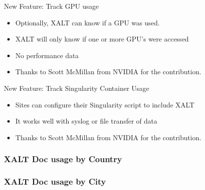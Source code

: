 \documentclass{beamer}
\begin{document}
\begin{frame}{New Feature: Track GPU usage}
  \begin{itemize}
    \item Optionally, XALT can know if a GPU was used.
    \item XALT will only know if one or more GPU's were accessed
    \item No performance data
    \item Thanks to Scott McMillan from NVIDIA for the contribution.
  \end{itemize}
\end{frame}

\begin{frame}{New Feature: Track Singularity Container Usage}
  \begin{itemize}
    \item Sites can configure their Singularity script to include XALT
    \item It works well with syslog or file transfer of data
    \item Thanks to Scott McMillan from NVIDIA for the contribution.
  \end{itemize}
\end{frame}

\begin{frame}[fragile]
    \frametitle{XALT Doc usage by Country}
\end{frame}

\begin{frame}[fragile]
    \frametitle{XALT Doc usage by City}
\end{frame}
\end{document}
